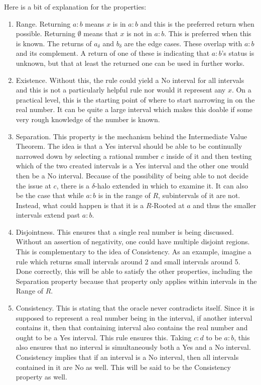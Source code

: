 \documentclass[12pt]{article}
\begin{document}
Here is a bit of explanation for the properties:
\begin{enumerate}
    \item Range. Returning $a:b$ means $x$ is in $a:b$ and this is the preferred return when possible. Returning $\emptyset$ means that $x$ is not in $a:b$. This is preferred when this is known. The returns of $a_{\delta}$ and $b_{\delta}$ are the edge cases. These overlap with $a:b$ and its complement.  A return of one of these is indicating that $a:b$'s status is unknown, but that at least the returned one can be used in further works. 
    \item Existence. Without this, the rule could yield a No interval for all intervals and this is not a particularly helpful rule nor would it represent any $x$. On a practical level, this is the starting point of where to start narrowing in on the real number. It can be quite a large interval which makes this doable if some very rough knowledge of the number is known. 
    \item Separation. This property is the mechanism behind the Intermediate Value Theorem. The idea is that a Yes interval should be able to be continually narrowed down by selecting a rational number $c$ inside of it and then testing which of the two created intervals is a Yes interval and the other one would then be a No interval. Because of the possibility of being able to not decide the issue at $c$, there is a $\delta$-halo extended in which to examine it. It can also be the case that while $a:b$ is in the range of $R$, subintervals of it are not. Instead, what could happen is that it is a $R$-Rooted at $a$ and thus the smaller intervals extend past $a:b$.
    \item Disjointness. This ensures that a single real number is being discussed. Without an assertion of negativity, one could have multiple disjoint regions. This is complementary to the idea of Consistency. As an example, imagine a rule which returns small intervals around 2 and small intervals around 5. Done correctly, this will be able to satisfy the other properties, including the Separation property because that property only applies within intervals in the Range of $R$. 
    \item Consistency. This is stating that the oracle never contradicts itself. Since it is supposed to represent a real number being in the interval, if another interval contains it, then that containing interval also contains the real number and ought to be a Yes interval. This rule ensures this. Taking $c:d$ to be $a:b$, this also ensures that no interval is simultaneously both a Yes and a No interval. Consistency implies that if an interval is a No interval, then all intervals contained in it are No as well. This will be said to be the Consistency property as well.

\end{enumerate}
\end{document}
